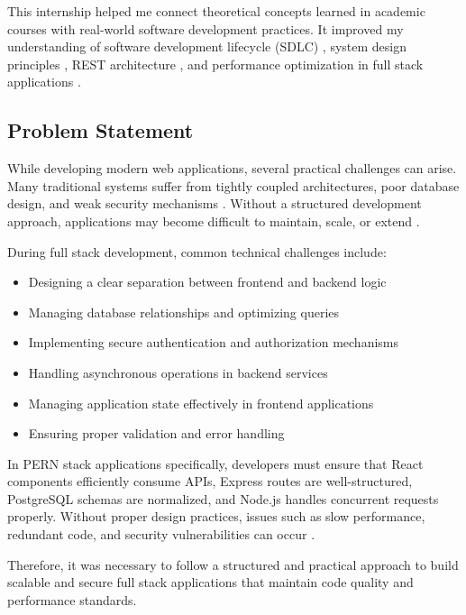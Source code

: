 This internship helped me connect theoretical concepts learned in academic courses with real-world software development practices. It improved my understanding of software development lifecycle (SDLC) \parencite{Sommerville2010}, system design principles \parencite{Newman2015}, REST architecture \parencite{Fielding2000}, and performance optimization in full stack applications \parencite{Beck2001}.

\subsection{Problem Statement}

While developing modern web applications, several practical challenges can arise. Many traditional systems suffer from tightly coupled architectures, poor database design, and weak security mechanisms \parencite{McGraw2006}. Without a structured development approach, applications may become difficult to maintain, scale, or extend \parencite{Sommerville2010}.

During full stack development, common technical challenges include:

\begin{itemize}
  \item Designing a clear separation between frontend and backend logic \parencite{Newman2015}
  \item Managing database relationships and optimizing queries \parencite{Codd1970}
  \item Implementing secure authentication and authorization mechanisms \parencite{McGraw2006}
  \item Handling asynchronous operations in backend services
  \item Managing application state effectively in frontend applications
  \item Ensuring proper validation and error handling
\end{itemize}

In PERN stack applications specifically, developers must ensure that React components efficiently consume APIs, Express routes are well-structured, PostgreSQL schemas are normalized, and Node.js handles concurrent requests properly. Without proper design practices, issues such as slow performance, redundant code, and security vulnerabilities can occur \parencite{Humble2010}.

Therefore, it was necessary to follow a structured and practical approach to build scalable and secure full stack applications that maintain code quality and performance standards.

